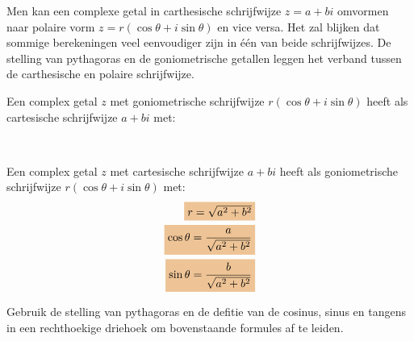 \documentclass{ximera}
\begin{document}
 
 

 
 
Men kan een complexe getal in carthesische schrijfwijze $z=a+bi$ omvormen naar polaire vorm $z = r(\cos \theta + i\sin\theta)$ en vice versa. Het zal blijken dat sommige berekeningen veel eenvoudiger zijn in één van beide schrijfwijzes. De stelling van pythagoras en de goniometrische getallen leggen het verband tussen de carthesische en polaire schrijfwijze. 

\begin{proposition}\label{eig:transformatie_complexe_getallen} \nl
     
    Een complex getal $z$ met goniometrische schrijfwijze $r(\cos \theta + i\sin\theta)$ heeft als cartesische schrijfwijze $a+bi$ met:
    \begin{center}
        \\
    \end{center}
    Een complex getal $z$ met cartesische schrijfwijze $a+bi$ heeft als goniometrische schrijfwijze $r(\cos \theta + i\sin\theta)$ met:
    \begin{align*}
    \important{r = \sqrt{a^2+b^2}} \\
    \important{\cos\theta  = \dfrac{a}{\sqrt{a^2+b^2}}}\\
    \important{\sin\theta  = \dfrac{b}{\sqrt{a^2+b^2}}}
    \end{align*}

\end{proposition}

 
\begin{quickquestion*}{}
    Gebruik de stelling van pythagoras en de defitie van de cosinus, sinus en tangens in een rechthoekige driehoek om bovenstaande formules af te leiden. 
\end{quickquestion*}
 
\end{document}
